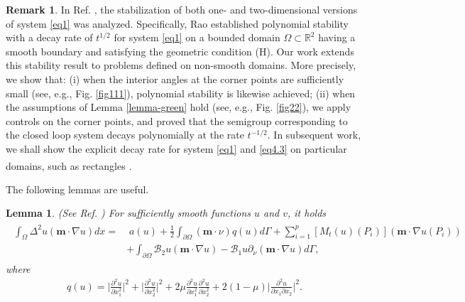 \documentclass[twoside]{article}
\newtheorem{lemma}[definition]{Lemma}
\theoremstyle{noparens}
\theoremstyle{definition}
\newtheorem{remark}[definition]{Remark}
\numberwithin{equation}{section}
\numberwithin{figure}{section}
\newcommand{\citeup}[1]{\textsuperscript{\cite{#1}}}
\begin{document}
\begin{remark}
	In Ref. \cite{Rao1,Rao2}, the stabilization of both one- and two-dimensional versions of system \eqref{eq1} was analyzed. Specifically, Rao established polynomial stability with a decay rate of $t^{1/2} $ for system \eqref{eq1} on a bounded domain $\Omega \subset {\mathbb R}^2$ having a smooth boundary and satisfying the geometric condition (H).
	Our work extends this stability result to problems defined on non-smooth domains. More precisely, we show that:  (i) when the interior angles at the corner points are sufficiently small (see, e.g., Fig. \ref{fig111}), polynomial stability is likewise achieved; (ii) when the assumptions of Lemma \ref{lemma-green} hold (see, e.g., Fig. \ref{fig22}), we apply controls on the corner points, and proved that the semigroup corresponding to the closed loop system decays polynomially at the rate $t^{-{1/2}} $. In subsequent  work, we shall show the explicit decay rate for  system \eqref{eq1} and \eqref{eq4.3} on particular domains, such as rectangles \citeup{sz}.
\end{remark}

\medskip

The following lemmas are useful.

\begin{lemma}\label{cor} (See Ref. \cite{chen1,chen2})
	For sufficiently smooth functions $u$ and $v$, it holds
	\begin{align}
		\begin{split}
			\int_{\Omega}\Delta^{2}u {(\mathbf{m}\cdot\nabla u)}dx=&
			\;a(u)+\frac{1}{2}\int_{\partial\Omega}
			(\mathbf{m}\cdot\nu)q(u)d\Gamma
			+\sum_{i=1}^p[M_t(u)(P_i)] ({\mathbf{m}\cdot\nabla u(P_i)})\\
			&+\int_{\partial\Omega}\mathcal{B}_{2}u {(\mathbf{m}\cdot\nabla u)}-\mathcal{B}_{1}u {\partial_{\nu}(\mathbf{m}\cdot\nabla u)}d\Gamma,
		\end{split}
	\end{align}
	where
	\begin{align}\label{bu}
		q(u)=\bigg|\frac{\partial^{2}u}{\partial x_{1}^{2}}\bigg|^{2}+
		\bigg|\frac{\partial^{2}u}{\partial x_{2}^{2}}\bigg|^{2}
		+2\mu\frac{\partial^{2}u}{\partial x_{1}^{2}}\frac{\partial^{2}u}{\partial x_{2}^{2}}
		+2(1-\mu)\bigg|\frac{\partial^{2}u}{\partial x_{1}\partial x_{2}}\bigg|^{2}.
	\end{align}
\end{lemma}
\end{document}
